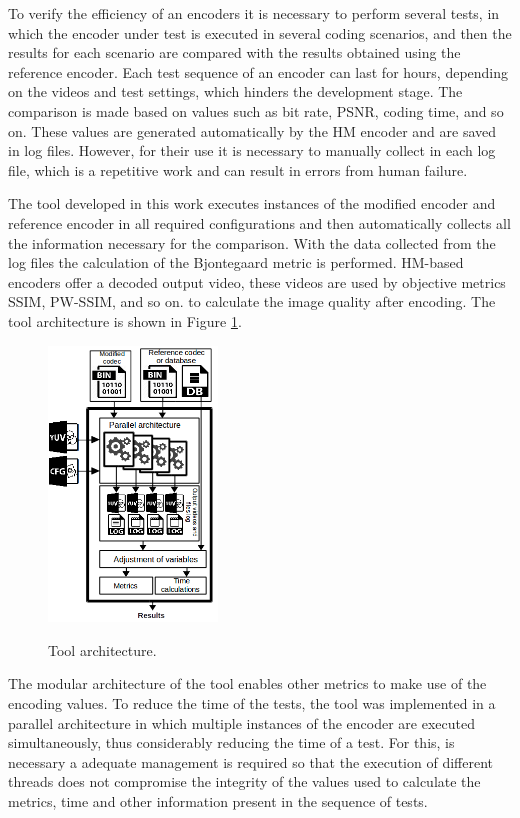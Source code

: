 \documentclass[journal]{IEEEtran}
\begin{document}
To verify the efficiency of an encoders it is necessary to perform several tests, in which the encoder under test is executed in several coding scenarios, and then the results for each scenario are compared with the results obtained using the reference encoder. Each test sequence of an encoder can last for hours, depending on the videos and test settings, which hinders the development stage. The comparison is made based on values such as bit rate, PSNR, coding time, and so on. These values are generated automatically by the HM encoder and are saved in log files. However, for their use it is necessary to manually collect in each log file, which is a repetitive work and can result in errors from human failure. 

The tool developed in this work executes instances of the modified encoder and reference encoder in all required configurations and then automatically collects all the information necessary for the comparison. With the data collected from the log files the calculation of the Bjontegaard \cite{Bjontegaard} metric is performed. HM-based encoders offer a decoded output video, these videos are used by objective metrics SSIM, PW-SSIM, and so on. to calculate the image quality after encoding. The tool architecture is shown in Figure \ref{fig:fluxo}. 



\FloatBarrier
\begin{figure}[!ht]
	\centering
	\caption{Tool architecture.}
	\includegraphics[width=0.4\textwidth]{figures/fluxo.png}
	\label{fig:fluxo}	
\end{figure}
\FloatBarrier

The modular architecture of the tool enables other metrics to make use of the encoding values. To reduce the time of the tests, the tool was implemented in a parallel architecture in which multiple instances of the encoder are executed simultaneously, thus considerably reducing the time of a test. For this, is necessary a adequate management is required so that the execution of different threads does not compromise the integrity of the values used to calculate the metrics, time and other information present in the sequence of tests.
\end{document}
